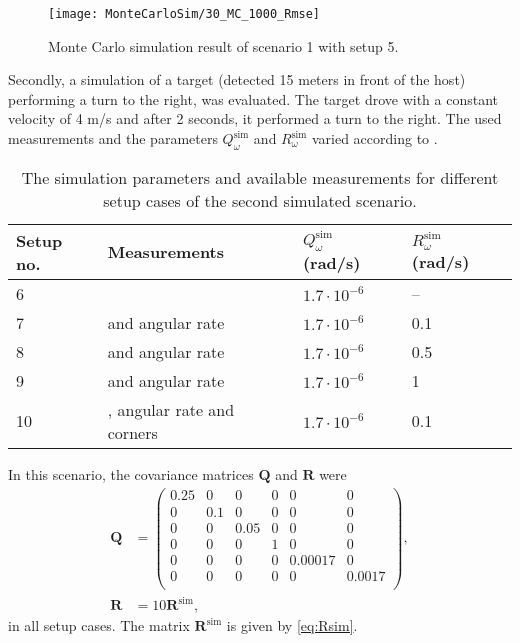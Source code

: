 \begin{figure}[!ht]
	\centering
	\texttt{[image: MonteCarloSim/30\_MC\_1000\_Rmse]}
	\caption{\label{fig:30montesimstraighttowardsroiangvelcornerrmse} Monte Carlo simulation result of scenario 1 with setup 5.}
\end{figure}

\clearpage

Secondly, a simulation of a target (detected 15 meters in front of the host) performing a turn to the right, was evaluated.
The target drove with a constant velocity of 4 m/s and after 2 seconds, it performed a turn to the right.
The used measurements and the parameters $Q^\text{sim}_\omega$ and $R^\text{sim}_\omega$ varied according to .

\begin{table}[!ht]
	\centering
	\caption{\label{tab:montesimscenario2} The simulation parameters and available measurements for different setup cases of the second simulated scenario.}
	\renewcommand{\arraystretch}{1.2}
	\begin{tabular}{|l|p{3.5cm}|l|l|}
		\hline
		\textbf{Setup no.} & \textbf{Measurements} & $Q^\text{sim}_\omega$ (rad/s) & $R^\text{sim}_\omega$ (rad/s) \\
		\hline
		6 & \abbrROI & $1.7\cdot 10^{-6}$ & -- \\
		\hline
		7 & \abbrROI and angular rate & $1.7\cdot 10^{-6}$ & 0.1 \\
		\hline
		8 & \abbrROI and angular rate & $1.7\cdot 10^{-6}$ & 0.5 \\
		\hline
		9 & \abbrROI and angular rate & $1.7\cdot 10^{-6}$ & 1 \\
		\hline
		10 & \abbrROI, angular rate and corners & $1.7\cdot 10^{-6}$ & 0.1 \\
		\hline
	\end{tabular}
\end{table}

In this scenario, the covariance matrices $\bm{Q}$ and $\bm{R}$ were
\begin{align}
	\label{eq:Qsim2}
	\bm{Q} &=
	\begin{pmatrix}
		0.25 & 0 & 0 & 0 & 0 & 0 \\
		0 & 0.1 & 0 & 0 & 0 & 0 \\
		0 & 0 & 0.05 & 0 & 0 & 0 \\
		0 & 0 & 0 & 1 & 0 & 0 \\
		0 & 0 & 0 & 0 & 0.00017 & 0 \\
		0 & 0 & 0 & 0 & 0 & 0.0017 \\
	\end{pmatrix}, \\
	\label{eq:Rsim2}
	\bm{R} &= 10 \bm{R}^\text{sim},
\end{align}
in all setup cases.
The matrix $\bm{R}^\text{sim}$ is given by \eqref{eq:Rsim}.

